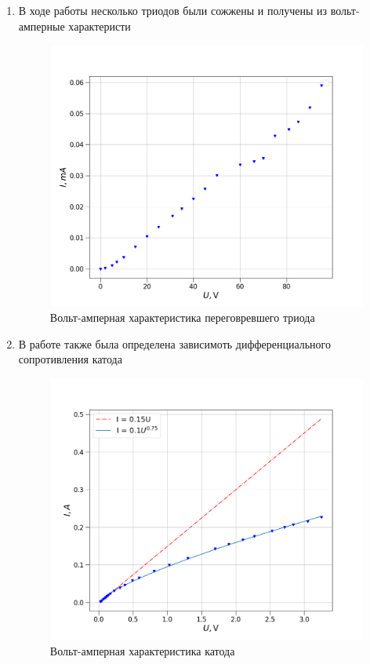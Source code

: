 \documentclass[a4paper, 12pt]{article}
\begin{document}
\begin{enumerate}
\item  В ходе работы несколько триодов были сожжены и получены из вольт-амперные характеристи
\begin{figure}[H]
        \centering
        \includegraphics[scale=0.5]{./pics/failed_triod.png}
        \caption{Вольт-амперная характеристика переговревшего триода}
\end{figure}
\newpage

\item В работе также была определена зависимоть дифференциального сопротивления катода

\begin{figure}[H]
        \centering
        \includegraphics[scale=0.5]{./pics/diff_resist.png}
        \caption{Вольт-амперная характеристика катода}
\end{figure}


\end{enumerate}
\end{document}
